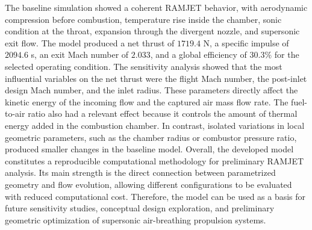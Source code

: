 \documentclass[preprint,12pt]{elsarticle}
\begin{document}
The baseline simulation showed a coherent RAMJET behavior, with aerodynamic compression before combustion, temperature rise inside the chamber, sonic condition at the throat, expansion through the divergent nozzle, and supersonic exit flow. The model produced a net thrust of $1719.4$ N, a specific impulse of $2094.6$ s, an exit Mach number of $2.033$, and a global efficiency of $30.3\%$ for the selected operating condition.
The sensitivity analysis showed that the most influential variables on the net thrust were the flight Mach number, the post-inlet design Mach number, and the inlet radius. These parameters directly affect the kinetic energy of the incoming flow and the captured air mass flow rate. The fuel-to-air ratio also had a relevant effect because it controls the amount of thermal energy added in the combustion chamber. In contrast, isolated variations in local geometric parameters, such as the chamber radius or combustor pressure ratio, produced smaller changes in the baseline model.
Overall, the developed model constitutes a reproducible computational methodology for preliminary RAMJET analysis. Its main strength is the direct connection between parametrized geometry and flow evolution, allowing different configurations to be evaluated with reduced computational cost. Therefore, the model can be used as a basis for future sensitivity studies, conceptual design exploration, and preliminary geometric optimization of supersonic air-breathing propulsion systems.
\end{document}
